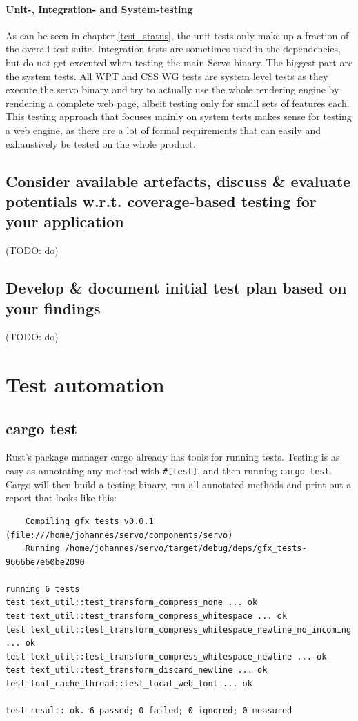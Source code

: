 \documentclass{scrartcl}
\newcommand{\todo}[1] {{\color{red}(TODO: #1)}}
\begin{document}
\paragraph{Unit-, Integration- and System-testing}
As can be seen in chapter \ref{test_status}, the unit tests only make up a fraction of the overall test suite. Integration tests are sometimes used in the dependencies, but do not get executed when testing the main Servo binary. The biggest part are the system tests. All WPT and CSS WG tests are system level tests as they execute the servo binary and try to actually use the whole rendering engine by rendering a complete web page, albeit testing only for small sets of features each. This testing approach that focuses mainly on system tests makes sense for testing a web engine, as there are a lot of formal requirements that can easily and exhaustively be tested on the whole product.


\subsection{Consider available artefacts, discuss \& evaluate potentials w.r.t. coverage-based testing for your application}
\todo{do}


\subsection{Develop \& document initial test plan based on your findings}
\todo{do}




\section{Test automation}


\subsection{cargo test}

Rust's package manager cargo already has tools for running tests. Testing is as easy as annotating any method with \texttt{\#[test]}, and then running \texttt{cargo test}. Cargo will then build a testing binary, run all annotated methods and print out a report that looks like this:


\begin{verbatim}
    Compiling gfx_tests v0.0.1 (file:///home/johannes/servo/components/servo)
    Running /home/johannes/servo/target/debug/deps/gfx_tests-9666be7e60be2090

running 6 tests
test text_util::test_transform_compress_none ... ok
test text_util::test_transform_compress_whitespace ... ok
test text_util::test_transform_compress_whitespace_newline_no_incoming ... ok
test text_util::test_transform_compress_whitespace_newline ... ok
test text_util::test_transform_discard_newline ... ok
test font_cache_thread::test_local_web_font ... ok

test result: ok. 6 passed; 0 failed; 0 ignored; 0 measured

\end{verbatim}
\end{document}
